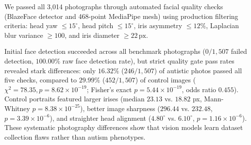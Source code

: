 \documentclass[conference]{IEEEtran}
\begin{document}
We passed all 3,014 photographs through automated facial quality checks (BlazeFace detector and 468-point MediaPipe mesh) using production filtering criteria: head yaw $\le 15^\circ$, head pitch $\le 15^\circ$, iris asymmetry $\le 12\%$, Laplacian blur variance $\ge 100$, and iris diameter $\ge 22\,\text{px}$.

\begin{table}[t]
\centering
\caption{Negative Audit for Open Pediatric Face Benchmark (Autism Image Data, $N = 3{,}014$)}
\label{tab:face_audit}
\footnotesize
\setlength{\tabcolsep}{3pt}
\vspace{-2mm}
\end{table}

Initial face detection succeeded across all benchmark photographs ($0/1{,}507$ failed detection, $100.00\%$ raw face detection rate), but strict quality gate pass rates revealed stark differences: only $16.32\%$ ($246/1{,}507$) of autistic photos passed all five checks, compared to $29.99\%$ ($452/1{,}507$) of control images ($\chi^2 = 78.35, p = 8.62 \times 10^{-19}$; Fisher's exact $p = 5.44 \times 10^{-19}$, odds ratio $0.455$). Control portraits featured larger irises (median $23.13$ vs. $18.82$ px, Mann-Whitney $p = 8.38 \times 10^{-25}$), better image sharpness ($296.44$ vs. $232.48$, $p = 3.39 \times 10^{-6}$), and straighter head alignment ($4.80^\circ$ vs. $6.10^\circ$, $p = 1.16 \times 10^{-6}$). These systematic photography differences show that vision models learn dataset collection flaws rather than autism phenotypes.
\end{document}
